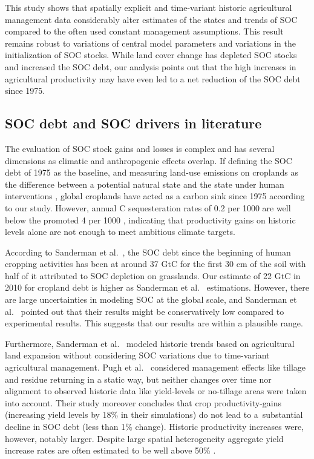 \documentclass[gc, manuscript]{copernicus}
\begin{document}
This study shows that spatially explicit and time-variant historic agricultural management data considerably alter estimates of the states and trends of SOC compared to the often used constant management assumptions. This result remains robust to variations of central model parameters and variations in the initialization of SOC stocks. While land cover change has depleted SOC stocks and increased the SOC debt, our analysis points out that the high increases in agricultural productivity may have even led to a net reduction of the SOC debt since 1975.

\hypertarget{soc-debt-and-soc-drivers-in-literature}{%
\subsection{SOC debt and SOC drivers in literature}\label{soc-debt-and-soc-drivers-in-literature}}

The evaluation of SOC stock gains and losses is complex and has several dimensions as climatic and anthropogenic effects overlap. If defining the SOC debt of 1975 as the baseline, and measuring land-use emissions on croplands as the difference between a potential natural state and the state under human interventions \citep[see][]{pugh_simulated_2015}, global croplands have acted as a carbon sink since 1975 according to our study. However, annual C sequesteration rates of 0.2 per 1000 are well below the promoted 4 per 1000 \citep{minasny_soil_2017}, indicating that productivity gains on historic levels alone are not enough to meet ambitious climate targets.

According to Sanderman et al.~\citeyearpar{sanderman_soil_2017}, the SOC debt since the beginning of human cropping activities has been at around 37 GtC for the first 30 cm of the soil with half of it attributed to SOC depletion on grasslands. Our estimate of 22 GtC in 2010 for cropland debt is higher as Sanderman et al.~\citeyearpar{sanderman_soil_2017} estimations. However, there are large uncertainties in modeling SOC at the global scale, and Sanderman et al.~\citeyearpar{sanderman_soil_2017} pointed out that their results might be conservatively low compared to experimental results. This suggests that our results are within a plausible range.

Furthermore, Sanderman et al.~\citeyearpar{sanderman_soil_2017} modeled historic trends based on agricultural land expansion without considering SOC variations due to time-variant agricultural management. Pugh et al.~\citeyearpar{pugh_simulated_2015} considered management effects like tillage and residue returning in a static way, but neither changes over time nor alignment to observed historic data like yield-levels or no-tillage areas were taken into account. Their study moreover concludes that crop productivity-gains (increasing yield levels by 18\% in their simulations) do not lead to a~substantial decline in SOC debt (less than 1\% change). Historic productivity increases were, however, notably larger. Despite large spatial heterogeneity aggregate yield increase rates are often estimated to be well above 50\% \citep{pellegrini_crop_2018, ray_recent_2012, rudel_agricultural_2009}.
\end{document}
